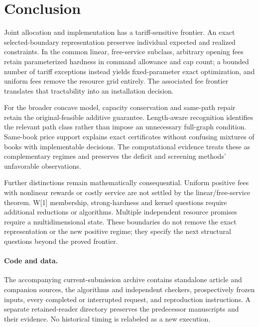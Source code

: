 \section{Conclusion}
Joint allocation and implementation has a tariff-sensitive frontier. An exact selected-boundary representation preserves individual expected and realized constraints. In the common linear, free-service subclass, arbitrary opening fees retain parameterized hardness in command allowance and cap count; a bounded number of tariff exceptions instead yields fixed-parameter exact optimization, and uniform fees remove the resource grid entirely. The associated fee frontier translates that tractability into an installation decision.

For the broader concave model, capacity conservation and same-path repair retain the original-feasible additive guarantee. Length-aware recognition identifies the relevant path class rather than impose an unnecessary full-graph condition. Same-book price support explains exact certificates without confusing mixtures of books with implementable decisions. The computational evidence treats these as complementary regimes and preserves the deficit and screening methods' unfavorable observations.

Further distinctions remain mathematically consequential. Uniform positive fees with nonlinear rewards or costly service are not settled by the linear/free-service theorem. W[1] membership, strong-hardness and kernel questions require additional reductions or algorithms. Multiple independent resource promises require a multidimensional state. These boundaries do not remove the exact representation or the new positive regime; they specify the next structural questions beyond the proved frontier.

\paragraph{Code and data.} The accompanying current-submission archive contains standalone article and companion sources, the algorithms and independent checkers, prospectively frozen inputs, every completed or interrupted request, and reproduction instructions. A separate retained-reader directory preserves the predecessor manuscripts and their evidence. No historical timing is relabeled as a new execution.

